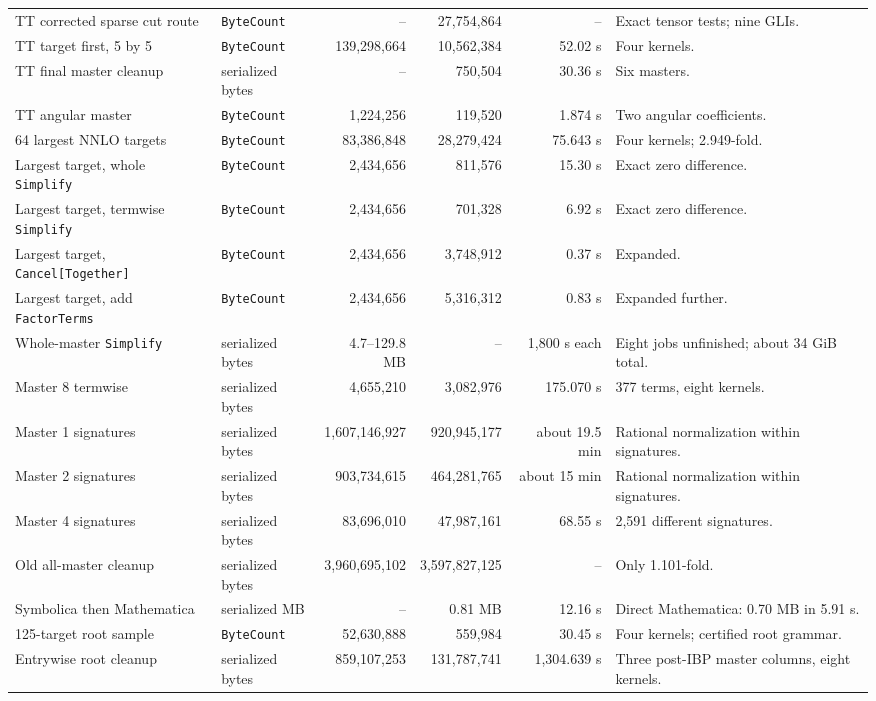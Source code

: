 \documentclass[11pt]{article}
\newcommand{\code}[1]{\texttt{#1}}
\begin{document}
\begin{landscape}
\begin{longtable}{@{}llrrrl@{}}
TT corrected sparse cut route & \code{ByteCount} & -- & 27,754,864 & -- & Exact tensor tests; nine GLIs.\\
TT target first, 5 by 5 & \code{ByteCount} & 139,298,664 & 10,562,384 & 52.02 s & Four kernels.\\
TT final master cleanup & serialized bytes & -- & 750,504 & 30.36 s & Six masters.\\
TT angular master & \code{ByteCount} & 1,224,256 & 119,520 & 1.874 s & Two angular coefficients.\\
64 largest NNLO targets & \code{ByteCount} & 83,386,848 & 28,279,424 & 75.643 s & Four kernels; 2.949-fold.\\
Largest target, whole \code{Simplify} & \code{ByteCount} & 2,434,656 & 811,576 & 15.30 s & Exact zero difference.\\
Largest target, termwise \code{Simplify} & \code{ByteCount} & 2,434,656 & 701,328 & 6.92 s & Exact zero difference.\\
Largest target, \code{Cancel[Together]} & \code{ByteCount} & 2,434,656 & 3,748,912 & 0.37 s & Expanded.\\
Largest target, add \code{FactorTerms} & \code{ByteCount} & 2,434,656 & 5,316,312 & 0.83 s & Expanded further.\\
Whole-master \code{Simplify} & serialized bytes & 4.7--129.8 MB & -- & 1,800 s each & Eight jobs unfinished; about 34 GiB total.\\
Master 8 termwise & serialized bytes & 4,655,210 & 3,082,976 & 175.070 s & 377 terms, eight kernels.\\
Master 1 signatures & serialized bytes & 1,607,146,927 & 920,945,177 & about 19.5 min & Rational normalization within signatures.\\
Master 2 signatures & serialized bytes & 903,734,615 & 464,281,765 & about 15 min & Rational normalization within signatures.\\
Master 4 signatures & serialized bytes & 83,696,010 & 47,987,161 & 68.55 s & 2,591 different signatures.\\
Old all-master cleanup & serialized bytes & 3,960,695,102 & 3,597,827,125 & -- & Only 1.101-fold.\\
Symbolica then Mathematica & serialized MB & -- & 0.81 MB & 12.16 s & Direct Mathematica: 0.70 MB in 5.91 s.\\
125-target root sample & \code{ByteCount} & 52,630,888 & 559,984 & 30.45 s & Four kernels; certified root grammar.\\
Entrywise root cleanup & serialized bytes & 859,107,253 & 131,787,741 & 1,304.639 s & Three post-IBP master columns, eight kernels.\\

\end{longtable}
\end{landscape}
\end{document}
